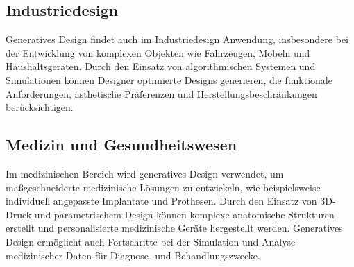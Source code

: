 \subsection*{Industriedesign}
Generatives Design findet auch im Industriedesign Anwendung, insbesondere bei der Entwicklung von komplexen Objekten wie Fahrzeugen, Möbeln und Haushaltsgeräten. Durch den Einsatz von algorithmischen Systemen und Simulationen können Designer optimierte Designs generieren, die funktionale Anforderungen, ästhetische Präferenzen und Herstellungsbeschränkungen berücksichtigen.

\subsection*{Medizin und Gesundheitswesen}
Im medizinischen Bereich wird generatives Design verwendet, um maßgeschneiderte medizinische Lösungen zu entwickeln, wie beispielsweise individuell angepasste Implantate und Prothesen. Durch den Einsatz von 3D-Druck und parametrischem Design können komplexe anatomische Strukturen erstellt und personalisierte medizinische Geräte hergestellt werden. Generatives Design ermöglicht auch Fortschritte bei der Simulation und Analyse medizinischer Daten für Diagnose- und Behandlungszwecke.


